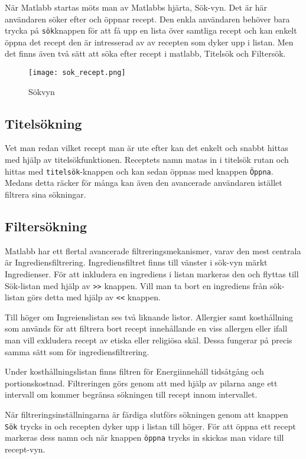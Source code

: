 När Matlabb startas möts man av Matlabbs hjärta, Sök-vyn. Det är här
användaren söker efter och öppnar recept. Den enkla användaren behöver
bara trycka på \verb+sök+knappen för att få upp en lista över samtliga
recept och kan enkelt öppna det recept den är intresserad av av
recepten som dyker upp i listan. Men det finns även två sätt att söka
efter recept i matlabb, Titelsök och Filtersök.

\begin{figure}[h]
        \centering 
        \texttt{[image: sok\_recept.png]} 
        \caption{Sökvyn} 
        \label{fig:sokvyn}
\end{figure}


\subsection{Titelsökning}
Vet man redan vilket recept man är ute efter kan det enkelt och snabbt
hittas med hjälp av titelsökfunktionen. Receptets namn matas in i
titelsök rutan och hittas med \verb+titelsök+-knappen och kan sedan öppnas
med knappen \verb+Öppna+. Medans detta räcker för många kan även den
avancerade användaren istället filtrera sina sökningar.

\subsection{Filtersökning}

Matlabb har ett flertal avancerade filtreringsmekanismer, varav den
mest centrala är Ingrediensfiltrering. Ingrediensfiltret finns till
vänster i sök-vyn märkt Ingredienser. För att inkludera en ingrediens
i listan markeras den och flyttas till Sök-listan med hjälp av \verb+>>+
knappen. Vill man ta bort en ingrediens från sök-listan görs detta med
hjälp av \verb+<<+ knappen.

Till höger om Ingreienslistan ses två liknande listor. Allergier samt
kosthållning som används för att filtrera bort recept innehållande en
viss allergen eller ifall man vill exkludera recept av etiska eller
religiösa skäl. Dessa fungerar på precis samma sätt som för
ingrediensfiltrering.

Under kosthållningslistan finns filtren för Energiinnehåll tidsåtgång
och portionskostnad. Filtreringen görs genom att med hjälp av pilarna
ange ett intervall om kommer begränsa sökningen till recept innom
intervallet.

När filtreringsinställningarna är färdiga slutförs sökningen genom att
knappen \verb+Sök+ trycks in och recepten dyker upp i listan till
höger. För att öppna ett recept markeras dess namn och när
knappen \verb+öppna+ trycks in skickas man vidare till recept-vyn.
